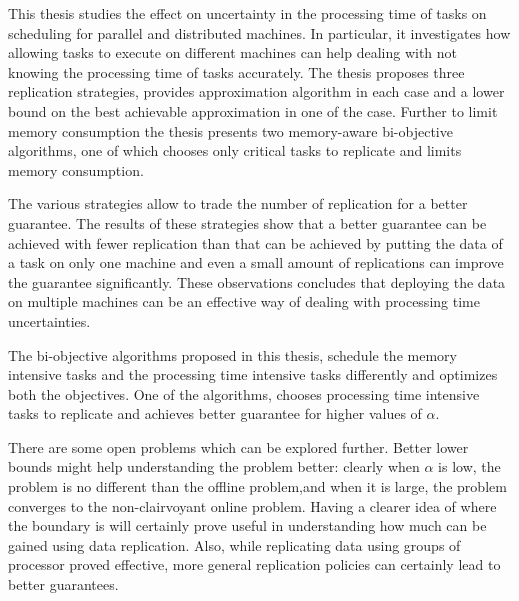 \label{ch6}

\label{Intro}

This thesis studies the effect on uncertainty in the processing time of tasks on scheduling for parallel and distributed machines. In particular, it investigates how allowing tasks to execute on different machines can help dealing with not knowing the processing time of tasks accurately. The thesis proposes three replication strategies, provides approximation algorithm in each case and a lower bound on the best achievable approximation in one of the case. Further to limit memory consumption the thesis presents two memory-aware bi-objective algorithms, one of which chooses only critical tasks to replicate and limits memory consumption.

The various strategies allow to trade the number of replication for a better guarantee. The results of these strategies show that a better guarantee can be achieved with fewer replication than that can be achieved by putting the data of a task on only one machine and even a small amount of replications can improve the guarantee significantly. These observations concludes that deploying the data on multiple machines can be an effective way of dealing with processing time uncertainties.

The bi-objective algorithms proposed in this thesis, schedule the memory intensive tasks and the processing time intensive tasks differently and optimizes both the objectives. One of the algorithms, chooses processing time intensive tasks to replicate and achieves better guarantee for higher values of $\alpha$.

There are some open problems which can be explored further. Better lower bounds might help understanding the problem better: clearly when $\alpha$ is low, the problem is no different than the offline problem,and when it is large, the problem converges to the non-clairvoyant online problem. Having a clearer idea of where the boundary is will certainly prove useful in understanding how much can be gained using data replication. Also, while replicating data using groups of processor proved effective, more general replication policies can certainly lead to better guarantees.

\newpage









